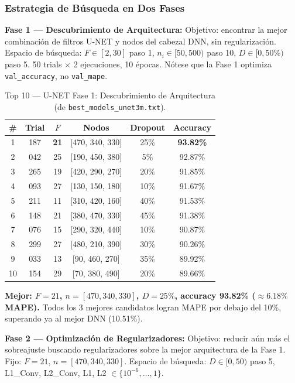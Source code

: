 \documentclass{article}
\begin{document}
\subsubsection{Estrategia de Búsqueda en Dos Fases}

\textbf{Fase 1 — Descubrimiento de Arquitectura:} Objetivo: encontrar la mejor combinación de filtros U-NET y nodos del cabezal DNN, sin regularización. Espacio de búsqueda: $F \in [2, 30]$ paso 1, $n_i \in [50, 500)$ paso 10, $D \in [0, 50\%)$ paso 5. 50 trials $\times$ 2 ejecuciones, 10 épocas. Nótese que la Fase 1 optimiza \texttt{val\_accuracy}, no \texttt{val\_mape}.

\begin{table}[htbp]
\centering
\caption{Top 10 — U-NET Fase 1: Descubrimiento de Arquitectura (de \texttt{best\_models\_unet3m.txt}).}
\label{tab:unet-phase1}
\begin{tabular}{cccccc}
\hline
\# & Trial & $F$ & Nodos & Dropout & Accuracy \\
\hline
1 & 187 & \textbf{21} & [470, 340, 330] & 25\% & \textbf{93.82\%} \\
2 & 042 & 25 & [190, 450, 380] & 5\%  & 92.87\% \\
3 & 265 & 19 & [420, 290, 270] & 20\% & 91.85\% \\
4 & 093 & 27 & [130, 150, 180] & 10\% & 91.67\% \\
5 & 211 & 11 & [310, 420, 160] & 40\% & 91.53\% \\
6 & 148 & 21 & [380, 470, 330] & 45\% & 91.38\% \\
7 & 076 & 15 & [290, 320, 440] & 10\% & 90.87\% \\
8 & 299 & 27 & [480, 210, 390] & 30\% & 90.26\% \\
9 & 033 & 13 & [90, 460, 270]  & 35\% & 89.92\% \\
10& 154 & 29 & [70, 380, 490]  & 20\% & 89.66\% \\
\hline
\end{tabular}
\end{table}

\textbf{Mejor: $F=21$, $n=[470,340,330]$, $D=25\%$, accuracy 93.82\% ($\approx 6.18\%$ MAPE).} Todos los 3 mejores candidatos logran MAPE por debajo del 10\%, superando ya al mejor DNN (10.51\%).

\textbf{Fase 2 — Optimización de Regularizadores:} Objetivo: reducir aún más el sobreajuste buscando regularizadores sobre la mejor arquitectura de la Fase 1. Fijo: $F=21$, $n=[470,340,330]$. Espacio de búsqueda: $D \in [0,50)$ paso 5, L1\_Conv, L2\_Conv, L1, L2 $\in \{10^{-6},\dots,1\}$.
\end{document}
